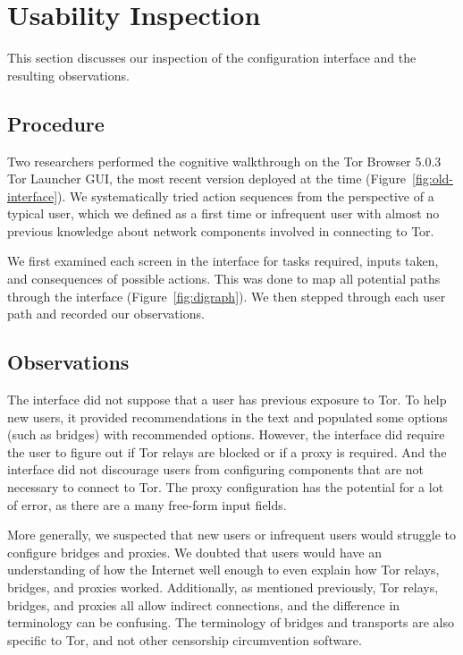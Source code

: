 \documentclass[USenglish,oneside,twocolumn]{article}
\begin{document}
\section{Usability Inspection}
\label{sec:inspection}
This section discusses our inspection of the configuration interface and the resulting observations.

\subsection{Procedure} 
Two researchers performed the cognitive walkthrough on the Tor Browser 5.0.3 Tor Launcher GUI, the most recent version deployed at the time (Figure~\ref{fig:old-interface}). We systematically tried action sequences from the perspective of a typical user, which we defined as a first time or infrequent user with almost no previous knowledge about network components involved in connecting to Tor.

We first examined each screen in the interface for tasks required, inputs taken, and consequences of possible actions. This was done to map all potential paths through the interface (Figure~\ref{fig:digraph}). We then stepped through each user path and recorded our observations. 

\subsection{Observations}
The interface did not suppose that a user has previous exposure to Tor. To help new users, it provided recommendations in the text and populated some options (such as bridges) with recommended options. However, the interface did require the user to figure out if Tor relays are blocked or if a proxy is required. And the interface did not discourage users from configuring components that are not necessary to connect to Tor. The proxy configuration has the potential for a lot of error, as there are a many free-form input fields. 

More generally, we suspected that new users or infrequent users would struggle to configure bridges and proxies. We doubted that users would have an understanding of how the Internet well enough to even explain how Tor relays, bridges, and proxies worked. Additionally, as mentioned previously, Tor relays, bridges, and proxies all allow indirect connections, and the difference in terminology can be confusing. The terminology of bridges and transports are also specific to Tor, and not other censorship circumvention software. 
\end{document}
